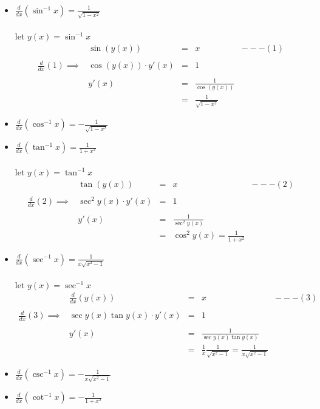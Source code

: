 \begin{itemize}
\item $\displaystyle \frac{d}{dx} (\sin ^{-1} x) = \frac{1}{\sqrt{1-x^2}}$\\\\
let $y(x) = \sin^{-1} x$
$$\begin{array}{rrcll}
& \sin (y(x)) & = & x & ---(1)\\\\
\displaystyle \frac{d}{dx}(1) \implies & \cos (y(x)) \cdot y'(x) & = & 1\\\\\
& y'(x) & = & \displaystyle \frac{1}{\cos (y(x))}\\
&& = & \displaystyle \frac{1}{\sqrt{1-x^2}}
\end{array}$$
\item $\displaystyle \frac{d}{dx} (\cos ^{-1} x) = - \frac{1}{\sqrt{1-x^2}}$
\item $\displaystyle \frac{d}{dx} (\tan ^{-1} x) = \frac{1}{1+x^2}$\\\\
let $y(x) = \tan ^{-1} x$\\
$$\begin{array}{rrcll}
& \tan (y(x)) & = & x & ---(2)\\\\
\displaystyle \frac{d}{dx}(2) \implies & \sec ^2 y(x) \cdot y'(x) & = & 1\\\\
& y'(x) & = & \displaystyle \frac{1}{\sec ^2 y(x)}\\
&& = & \displaystyle \cos ^2 y(x) = \frac{1}{1+x^2}
\end{array}$$
\item $\displaystyle \frac{d}{dx} (\sec ^{-1} x) = \frac{1}{x \sqrt{x^2 -1}}$\\\\
let $y(x) = \sec ^{-1} x$
$$\begin{array}{rrcll}
& \displaystyle \frac{d}{dx} (y(x)) & = & x & ---(3)\\\\
\displaystyle \frac{d}{dx}(3) \implies & \sec y(x) \tan y(x) \cdot y'(x) & = & 1\\\\
&y'(x) & = & \displaystyle \frac{1}{\sec y(x) \tan y(x)}\\
&& = & \displaystyle \frac{1}{x} \frac{1}{\sqrt{x^2-1}} = \frac{1}{x \sqrt{x^2-1}}
\end{array}$$
\item $\displaystyle \frac{d}{dx} (\csc ^{-1} x) = - \frac{1}{x \sqrt{x^2-1}}$
\item $\displaystyle \frac{d}{dx} (\cot ^{-1} x) = - \frac{1}{1+x^2}$\\\\
\end{itemize}

